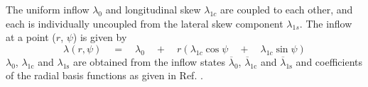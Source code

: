 The uniform inflow $\lambda_0$ and longitudinal skew $\lambda_{1c}$ are coupled to each other, and each is individually uncoupled from the lateral skew component $\lambda_{1s}$. The inflow at a point ($r$, $\psi$) is given by 
\[ \lambda(r,\psi) \quad = \quad \lambda_0 \quad + \quad r \left(\lambda_{1c} \cos \psi \quad + \quad \lambda_{1c} \sin \psi\right) \]
$\lambda_0$, $\lambda_\textrm{1c}$ and $\lambda_\textrm{1s}$ are obtained from the inflow states $\overline{\lambda}_0$, $\overline{\lambda}_\textrm{1c}$ and $\overline{\lambda}_\textrm{1s}$ and coefficients of the radial basis functions as given in Ref. \cite{He1989}. 

